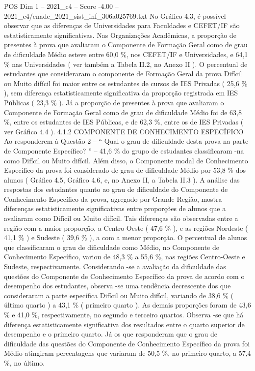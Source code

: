 \begin{textsample}{POS Dim 1 – 2021\_c4 – Score -4.00 – 2021\_c4/enade\_2021\_sist\_inf\_306a025769.txt}
No Gráfico 4.3, é possível observar que as diferenças de Universidades para Faculdades e CEFET/IF são estatisticamente significativas.
Nas Organizações Acadêmicas, a proporção de presentes à prova que avaliaram o Componente de Formação Geral como de grau de dificuldade Médio esteve entre 60,0 \%, nos CEFET/IF e Universidades, e 64,1 \% nas Universidades ( ver também a Tabela II.2, no Anexo II ).
O percentual de estudantes que consideraram o componente de Formação Geral da prova Difícil ou Muito difícil foi maior entre os estudantes de cursos de IES Privadas ( 25,6 \% ), sem diferença estatisticamente significativa da proporção registrada em IES Públicas ( 23,3 \% ).
Já a proporção de presentes à prova que avaliaram o Componente de Formação Geral como de grau de dificuldade Médio foi de 63,8 \%, entre os estudantes de IES Públicas, e de 62,3 \%, entre os de IES Privadas ( ver Gráfico 4.4 ). 4.1.2 COMPONENTE DE CONHECIMENTO ESPECÍFICO Ao responderem à Questão 2 – “ Qual o grau de dificuldade desta prova na parte de Componente Específico? ” – 41,6 \% do grupo de estudantes classificaram -na como Difícil ou Muito difícil.
Além disso, o Componente modal de Conhecimento Específico da prova foi considerado de grau de dificuldade Médio por 53,8 \% dos alunos ( Gráfico 4.5, Gráfico 4.6, e, no Anexo II, a Tabela II.3 ).
A análise das respostas dos estudantes quanto ao grau de dificuldade do Componente de Conhecimento Específico da prova, agregado por Grande Região, mostra diferenças estatisticamente significativas entre proporções de alunos que a avaliaram como Difícil ou Muito difícil.
Tais diferenças são observadas entre a região com a maior proporção, a Centro-Oeste ( 47,6 \% ), e as regiões Nordeste ( 41,1 \% ) e Sudeste ( 39,6 \% ), a com a menor proporção.
O percentual de alunos que classificaram o grau de dificuldade como Médio, no Componente de Conhecimento Específico, variou de 48,3 \% a 55,6 \%, nas regiões Centro-Oeste e Sudeste, respectivamente.
Considerando -se a avaliação da dificuldade das questões do Componente de Conhecimento Específico da prova de acordo com o desempenho dos estudantes, observa -se uma tendência decrescente dos que consideraram a parte específica Difícil ou Muito difícil, variando de 38,6 \% ( último quarto ) a 43,1 \% ( primeiro quarto ).
As demais proporções foram de 43,6 \% e 41,0 \%, respectivamente, no segundo e terceiro quartos.
Observa -se que há diferença estatisticamente significativa dos resultados entre o quarto superior de desempenho e o primeiro quarto.
Já os que responderam que o grau de dificuldade das questões do Componente de Conhecimento Específico da prova foi Médio atingiram percentagens que variaram de 50,5 \%, no primeiro quarto, a 57,4 \%, no último.

\end{textsample}
